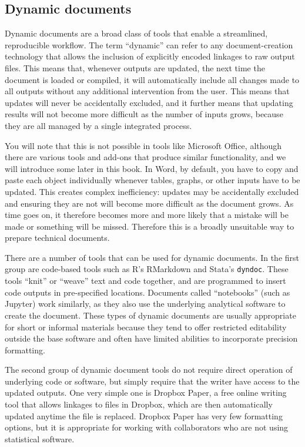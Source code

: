 \subsection{Dynamic documents}

Dynamic documents are a broad class of tools that enable a streamlined, reproducible workflow.
The term ``dynamic'' can refer to any document-creation technology
that allows the inclusion of explicitly encoded linkages to raw output files.
This means that, whenever outputs are updated,
the next time the document is loaded or compiled, it will automatically include
all changes made to all outputs without any additional intervention from the user.
This means that updates will never be accidentally excluded,
and it further means that updating results will not become more difficult
as the number of inputs grows,
because they are all managed by a single integrated process.

You will note that this is not possible in tools like Microsoft Office,
although there are various tools and add-ons that produce similar functionality,
and we will introduce some later in this book.
In Word, by default, you have to copy and paste each object individually
whenever tables, graphs, or other inputs have to be updated.
This creates complex inefficiency: updates may be accidentally excluded
and ensuring they are not will become more difficult as the document grows.
As time goes on, it therefore becomes more and more likely
that a mistake will be made or something will be missed.
Therefore this is a broadly unsuitable way to prepare technical documents.

There are a number of tools that can be used for dynamic documents.
In the first group are code-based tools such as R's RMarkdown
and Stata's \texttt{dyndoc}.
These tools ``knit'' or ``weave'' text and code together,
and are programmed to insert code outputs in pre-specified locations.
Documents called ``notebooks'' (such as Jupyter) work similarly,
as they also use the underlying analytical software to create the document.
These types of dynamic documents are usually appropriate for short or informal materials
because they tend to offer restricted editability outside the base software
and often have limited abilities to incorporate precision formatting.

The second group of dynamic document tools do not require
direct operation of underlying code or software, but simply require
that the writer have access to the updated outputs.
One very simple one is Dropbox Paper, a free online writing tool
that allows linkages to files in Dropbox,
which are then automatically updated anytime the file is replaced.
Dropbox Paper has very few formatting options,
but it is appropriate for working with collaborators who are not using statistical software.

